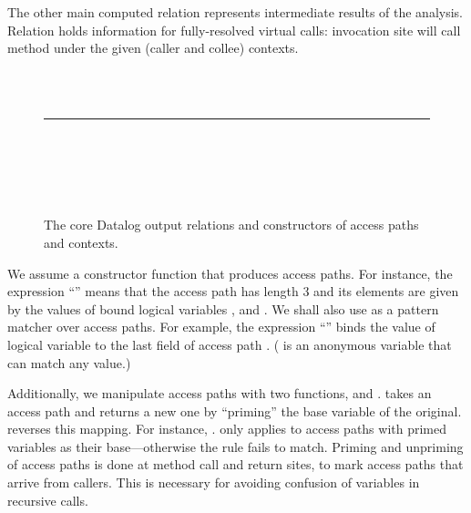 The other main computed relation represents intermediate results of the analysis. Relation  holds information for fully-resolved virtual calls: invocation site  will call method  under the given (caller and collee) contexts.

\begin{figure}[t]
\begin{datalog}
 \\
 \\
%
\noindent\rule{\textwidth}{0.5pt}\\
%
 \\
 \\
 \\
\end{datalog}
\caption[]{The core Datalog output relations and constructors of access paths and contexts.}
\label{fig:must-logic:output}
\end{figure}



We assume a constructor function  that produces access paths. For instance, the expression ``'' means that the access path  has length 3 and its elements are given by the values of bound logical variables ,  and . We shall also use  as a pattern matcher over access paths. For example, the expression ``'' binds the value of logical variable  to the last field of access path . (\args{\_} is an anonymous variable that can match any value.)

Additionally, we manipulate access paths with two functions,  and .  takes an access path and returns a new one by ``priming'' the base variable of the original.  reverses this mapping. For instance, .  only applies to access paths with primed variables as their base---otherwise the rule fails to match. Priming and unpriming of access paths is done at method call and return sites, to mark access paths that arrive from callers. This is necessary for avoiding confusion of variables in recursive calls.

